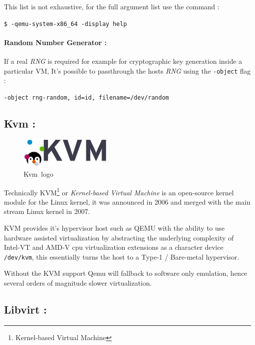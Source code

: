 \documentclass[
  14pt,
  english,
  a4paper,
]{scrreprt}
\begin{document}
This list is not exhaustive, for the full argument list use the command
:

\texttt{\$\ -qemu-system-x86\_64\ -display\ help}

\hypertarget{random-number-generator}{%
\paragraph*{Random Number Generator :}\label{random-number-generator}}

If a real \emph{RNG} is required for example for cryptographic key
generation inside a particular VM, It's possible to passthrough the
hosts \emph{RNG} using the \texttt{-object} flag :

\texttt{-object\ rng-random,\ id=id,\ filename=/dev/random}

\hypertarget{kvm}{%
\subsection{Kvm :}\label{kvm}}

\begin{figure}
\centering
\includegraphics[width=0.4\textwidth,height=\textheight]{figures/Kvm-pretty-text-logo.png}
\caption{Kvm~logo}
\end{figure}

Technically KVM\footnote{Kernel-based Virtual Machine} or
\emph{Kernel-based Virtual Machine} is an open-source kernel module for
the Linux kernel, it was announced in 2006 and merged with the main
stream Linux kernel in 2007.

KVM provides it's hypervisor host such as QEMU with the ability to use
hardware assisted virtualization by abstracting the underlying
complexity of Intel-VT and AMD-V cpu virtualization extensions as a
character device \texttt{/dev/kvm}, this essentially turns the host to a
Type-1 / Bare-metal hypervisor.

Without the KVM support Qemu will fallback to software only emulation,
hence several orders of magnitude slower virtualization.

\hypertarget{libvirt}{%
\subsection{Libvirt :}\label{libvirt}}
\end{document}
